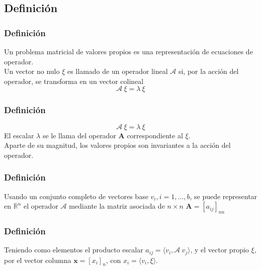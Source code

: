 \subsection{Definición}
\begin{frame}
\frametitle{Definición}
Un problema matricial de valores propios es una representación de ecuaciones de operador.
\\
\bigskip
Un vector no nulo $\xi$ es llamado  de un operador lineal $\mathcal{A}$ si, por la acción del operador, se transforma en un vector colineal
\begin{equation}
\mathcal{A} \: \xi = \lambda \: \xi
\label{eq:ecuacion_08_01}
\end{equation}
\end{frame}
\begin{frame}
\frametitle{Definición}
\begin{equation*}
\mathcal{A} \: \xi = \lambda \: \xi
\end{equation*}
El escalar $\lambda$ se le llama  del operador $\mathbf{A}$ correspondiente al  $\xi$.
\\
\bigskip
Aparte de su magnitud, los valores propios son invariantes a la acción del operador.
\end{frame}
\begin{frame}
\frametitle{Definición}
Usando un conjunto completo de vectores base ${v_{i}, i = 1, \ldots, b}$, se puede representar en $\mathbb{R}^{n}$ el operador $\mathcal{A}$ mediante la matriz asociada de $n \times n$ $\mathbf{A} =  [a_{ij}]_{nn}$
\end{frame}
\begin{frame}
\frametitle{Definición}
Teniendo como elementos el producto escalar $a_{ij} = \langle v_{i}, \mathcal{A} \: v_{j} \rangle$, y el vector propio $\xi$, por el vector columna $\mathbf{x} = [x_{i}]_{n}$, con $x_{i} = \langle v_{i}, \xi \rangle$.
\end{frame}
